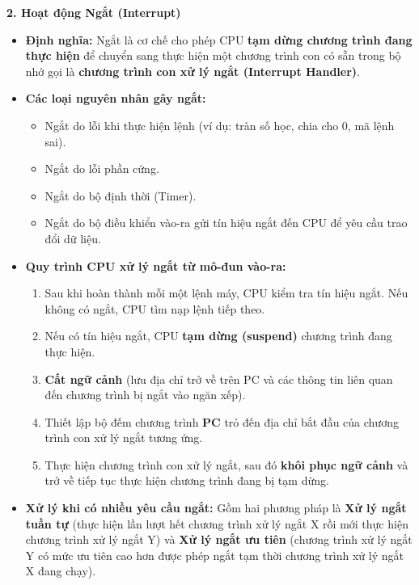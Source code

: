 \textbf{2. Hoạt động Ngắt (Interrupt)}
\begin{itemize}
    \item \textbf{Định nghĩa:} Ngắt là cơ chế cho phép CPU \textbf{tạm dừng chương trình đang thực hiện} để chuyển sang thực hiện một chương trình con có sẵn trong bộ nhớ gọi là \textbf{chương trình con xử lý ngắt (Interrupt Handler)}.
    \item \textbf{Các loại nguyên nhân gây ngắt:}
    \begin{itemize}
        \item Ngắt do lỗi khi thực hiện lệnh (ví dụ: tràn số học, chia cho 0, mã lệnh sai).
        \item Ngắt do lỗi phần cứng.
        \item Ngắt do bộ định thời (Timer).
        \item Ngắt do bộ điều khiển vào-ra gửi tín hiệu ngắt đến CPU để yêu cầu trao đổi dữ liệu.
    \end{itemize}
    \item \textbf{Quy trình CPU xử lý ngắt từ mô-đun vào-ra:}
    \begin{enumerate}
        \item Sau khi hoàn thành mỗi một lệnh máy, CPU kiểm tra tín hiệu ngắt. Nếu không có ngắt, CPU tìm nạp lệnh tiếp theo.
        \item Nếu có tín hiệu ngắt, CPU \textbf{tạm dừng (suspend)} chương trình đang thực hiện.
        \item \textbf{Cất ngữ cảnh} (lưu địa chỉ trở về trên PC và các thông tin liên quan đến chương trình bị ngắt vào ngăn xếp).
        \item Thiết lập bộ đếm chương trình \textbf{PC} trỏ đến địa chỉ bắt đầu của chương trình con xử lý ngắt tương ứng.
        \item Thực hiện chương trình con xử lý ngắt, sau đó \textbf{khôi phục ngữ cảnh} và trở về tiếp tục thực hiện chương trình đang bị tạm dừng.
    \end{enumerate}
    \item \textbf{Xử lý khi có nhiều yêu cầu ngắt:} Gồm hai phương pháp là \textbf{Xử lý ngắt tuần tự} (thực hiện lần lượt hết chương trình xử lý ngắt X rồi mới thực hiện chương trình xử lý ngắt Y) và \textbf{Xử lý ngắt ưu tiên} (chương trình xử lý ngắt Y có mức ưu tiên cao hơn được phép ngắt tạm thời chương trình xử lý ngắt X đang chạy).
\end{itemize}

